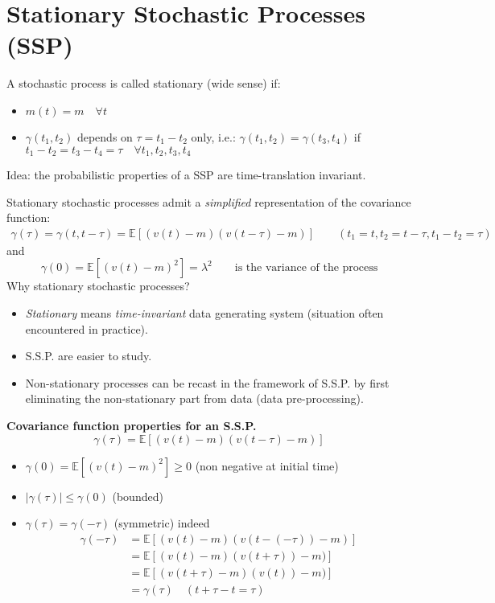 \section{Stationary Stochastic Processes (SSP)}
A stochastic process is called stationary (wide sense) if:
\begin{itemize}
	\item $m(t)=m \quad \forall t$
	\item $\gamma(t_{1}, t_{2})$ depends on $\tau=t_{1}-t_{2}$ only, i.e.: $\gamma(t_{1}, t_{2})=\gamma(t_{3}, t_{4})$ if $t_{1}-t_{2}=t_{3}-t_{4}=\tau \quad \forall t_{1}, t_{2}, t_{3}, t_{4}$
\end{itemize}
Idea: the probabilistic properties of a SSP are time-translation invariant.

Stationary stochastic processes admit a \emph{simplified} representation of the covariance function:
\begin{gather*}
\gamma(\tau)=\gamma(t, t-\tau)=\mathbb{E}[(v(t)-m)(v(t-\tau)-m)]\qquad (t_{1}=t, t_{2}=t-\tau, t_{1}-t_{2}=\tau)
\end{gather*}
and
\[
	\gamma(0)=\mathbb{E}[(v(t)-m)^{2}]=\lambda^2  \qquad \text{is the variance of the process}
\]
Why stationary stochastic processes?
\begin{itemize}
	\item \emph{Stationary} means \emph{time-invariant} data generating system (situation often encountered in practice).
	\item S.S.P. are easier to study.
	\item Non-stationary processes can be recast in the framework of S.S.P. by first eliminating the non-stationary part from data (data pre-processing).
\end{itemize}

\textbf{Covariance function properties for an S.S.P.}
$$
\gamma(\tau)=\mathbb{E}[(v(t)-m)(v(t-\tau)-m)]
$$
\begin{itemize}
	\item $\gamma(0)=\mathbb{E}[(v(t)-m)^{2}] \geq 0$ (non negative at initial time)
	\item $|\gamma(\tau)| \leq \gamma(0)$ (bounded)
	\item $\gamma(\tau)=\gamma(-\tau)$ (symmetric) indeed
	\begin{align*}
		\gamma(-\tau)&=\mathbb{E}[(v(t)-m)(v(t-(-\tau))-m)]\\
		&=\mathbb{E}[(v(t)-m)(v(t+\tau))-m)]\\
		&=\mathbb{E}[(v(t+\tau)-m)(v(t))-m)]\\
		&=\gamma(\tau) \quad(t+\tau-t=\tau)
	\end{align*}
\end{itemize}

